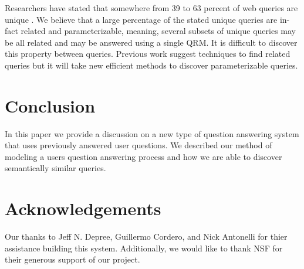 Researchers have stated that somewhere from 39 to 63 percent of web
queries are unique \cite{1277770,331405,621942}.  We believe that a
large percentage of the stated unique queries are in-fact related and
parameterizable, meaning, several subsets of unique queries may be all
related and may be answered using a single QRM.  It is difficult to
discover this property between queries.  Previous work suggest
techniques to find related queries but it will take new efficient
methods to discover parameterizable queries.


\section{Conclusion}

In this paper we provide a discussion on a new type of question
answering system that uses previously answered user questions.  We
described our method of modeling a users question answering process
and how we are able to discover semantically similar queries.


\section{Acknowledgements}
Our thanks to Jeff N. Depree, Guillermo Cordero, and Nick Antonelli for thier assistance building this system. Additionally, we would like to thank NSF for their generous support of our project.
